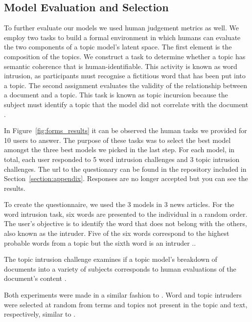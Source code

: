 \documentclass[twoside,12pt,a4paper]{article}
\begin{document}
\subsection{Model Evaluation and Selection}
To further evaluate our models we used human judgement metrics as well. We employ two tasks to build a formal environment in which humans can evaluate the two components of a topic model's latent space. The first element is the composition of the topics. We construct a task to determine whether a topic has semantic coherence that is human-identifiable. This activity is known as word intrusion, as participants must recognise a fictitious word that has been put into a topic. The second assignment evaluates the validity of the relationship between a document and a topic. This task is known as topic incursion because the subject must identify a topic that the model did not correlate with the document \citep{nikolenko_topic_2017}.

In Figure~\ref{fig:forms_results} it can be observed the human tasks we provided for 10 users to answer. The purpose of these tasks was to select the best model amongst the three best models we picked in the last step. For each model, in total, each user responded to 5 word intrusion challenges and 3 topic intrusion challenges. The url to the questionary can be found in the repository included in Section~\ref{section:appendix}. Responses are no longer accepted but you can see the results.

To create the questionnaire, we used the 3 models in 3 news articles. For the word intrusion task, six words are presented to the individual in a random order.
The user's objective is to identify the word that does not belong with the others, also known as the intruder. Five of the six words correspond to the highest probable words from a topic but the sixth word is an intruder \citep{nikolenko_topic_2017}..

The topic intrusion challenge examines if a topic model's breakdown of documents into a variety of subjects corresponds to human evaluations of the document's content \citep{nikolenko_topic_2017}. 

Both experiments were made in a similar fashion to \citep{nikolenko_topic_2017, chang_reading_nodate}. Word and topic intruders were selected at random from terms and topics not present in the topic and text, respectively, similar to \citep{nikolenko_topic_2017}.
\end{document}

